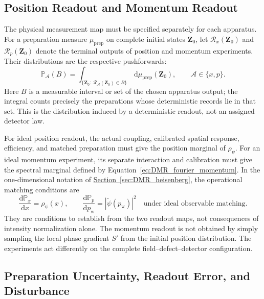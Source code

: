 \subsection{Position Readout and Momentum Readout}

The physical measurement map must be specified separately for each apparatus. For a preparation measure $\mu_{\mathrm{prep}}$ on complete initial states $\mathbf Z_0$, let $\mathcal R_x(\mathbf Z_0)$ and $\mathcal R_p(\mathbf Z_0)$ denote the terminal outputs of position and momentum experiments. Their distributions are the respective pushforwards:
\begin{equation}
 \mathbb P_{\mathcal A}(B)=
 \int_{\{\mathbf Z_0:\,\mathcal R_{\mathcal A}(\mathbf Z_0)\in B\}}
 \,\mathrm d\mu_{\mathrm{prep}}(\mathbf Z_0),
 \qquad \mathcal A\in\{x,p\}.
\label{eq:DMR_readout_pushforward}
\end{equation}
Here $B$ is a measurable interval or set of the chosen apparatus output; the integral counts precisely the preparations whose deterministic records lie in that set. This is the distribution induced by a deterministic readout, not an assigned detector law.

For ideal position readout, the actual coupling, calibrated spatial response, efficiency, and matched preparation must give the position marginal of $\rho_\psi$. For an ideal momentum experiment, its separate interaction and calibration must give the spectral marginal defined by Equation~\eqref{eq:DMR_fourier_momentum}. In the one-dimensional notation of \hyperref[sec:DMR_heisenberg]{Section~\ref*{sec:DMR_heisenberg}}, the operational matching conditions are
\begin{equation}
 \boxed{
 \frac{\mathrm d\mathbb P_x}{\mathrm dx}=\rho_\psi(x),
 \qquad
 \frac{\mathrm d\mathbb P_p}{\mathrm dp_{\mathrm w}}
 =|\widetilde\psi(p_{\mathrm w})|^2
 \quad\text{under ideal observable matching}.
 }
\label{eq:DMR_operational_matching}
\end{equation}
They are conditions to establish from the two readout maps, not consequences of intensity normalization alone. The momentum readout is not obtained by simply sampling the local phase gradient $S'$ from the initial position distribution. The experiments act differently on the complete field--defect--detector configuration.

\subsection{Preparation Uncertainty, Readout Error, and Disturbance}

